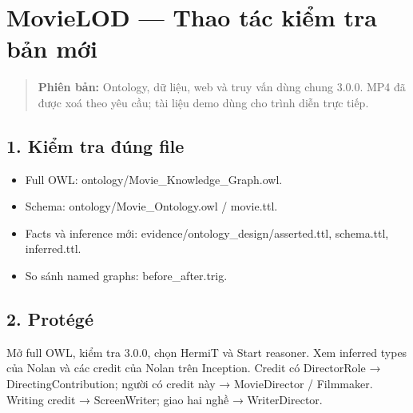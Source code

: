 \documentclass[
  11pt,
]{article}
\author{}
\date{}
\providecommand{\tightlist}{%
  \setlength{\itemsep}{0pt}\setlength{\parskip}{0pt}}
\begin{document}
\section{MovieLOD --- Thao tác kiểm tra bản
mới}\label{movielod-thao-tuxe1c-kiux1ec3m-tra-bux1ea3n-mux1edbi}

\begin{quote}
\textbf{Phiên bản:} Ontology, dữ liệu, web và truy vấn dùng chung 3.0.0.
MP4 đã được xoá theo yêu cầu; tài liệu demo dùng cho trình diễn trực
tiếp.
\end{quote}

\subsection{1. Kiểm tra đúng file}\label{kiux1ec3m-tra-ux111uxfang-file}

\begin{itemize}
\tightlist
\item
  Full OWL:
  ontology\allowbreak{}/\allowbreak{}\allowbreak{}Movie\_\allowbreak{}\allowbreak{}K\allowbreak{}nowledge\allowbreak{}\_\allowbreak{}\allowbreak{}Graph.\allowbreak{}o\allowbreak{}wl.\allowbreak{}
\item
  Schema:
  ontology\allowbreak{}/\allowbreak{}\allowbreak{}Movie\_\allowbreak{}\allowbreak{}O\allowbreak{}ntology.\allowbreak{}owl
  / movie.ttl.
\item
  Facts và inference mới:
  evidence\allowbreak{}/\allowbreak{}ontolog\allowbreak{}y\_\allowbreak{}design\allowbreak{}/\allowbreak{}asserte\allowbreak{}d.\allowbreak{}ttl,
  schema.ttl, inferred\allowbreak{}.\allowbreak{}ttl.\allowbreak{}
\item
  So sánh named graphs:
  before\_\allowbreak{}a\allowbreak{}fter.\allowbreak{}tri\allowbreak{}g.\allowbreak{}
\end{itemize}

\subsection{2. Protégé}\label{protuxe9guxe9}

Mở full OWL, kiểm tra 3.0.0, chọn HermiT và Start reasoner. Xem inferred
types của Nolan và các credit của Nolan trên Inception. Credit có
DirectorRole →
Directin\allowbreak{}g\allowbreak{}Contrib\allowbreak{}ution; người có
credit này → Movie\allowbreak{}Dir\allowbreak{}ector / Filmmaker.
Writing credit → Screen\allowbreak{}Wr\allowbreak{}iter; giao hai nghề →
Writer\allowbreak{}Di\allowbreak{}rector.\allowbreak{}
\end{document}
